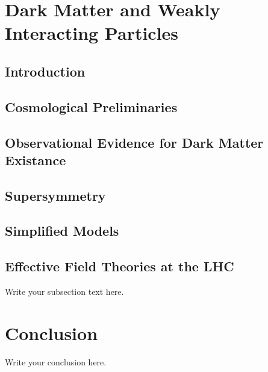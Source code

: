 \documentclass[draftfoot,preprint]{cit_thesis}
\begin{document}
\section{Dark Matter and Weakly Interacting Particles}
\subsection{Introduction}
\subsection{Cosmological Preliminaries}
\subsection{Observational Evidence for Dark Matter Existance}
\subsection{Supersymmetry}
\subsection{Simplified Models}
\subsection{Effective Field Theories at the LHC}

Write your subsection text here.

\section{Conclusion}
Write your conclusion here.
\end{document}
